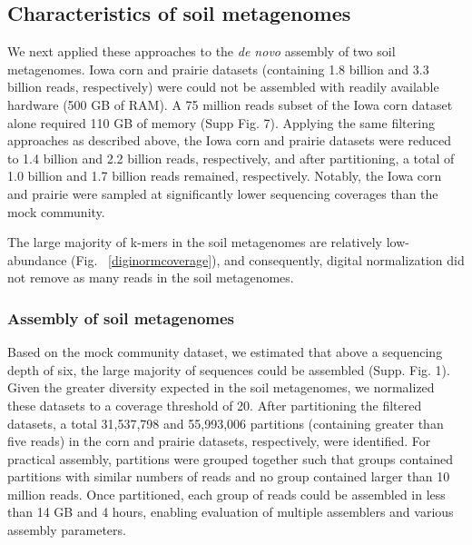 \documentclass[11pt]{article} %
\begin{document}
\subsection{Characteristics of soil metagenomes}

We next applied these approaches to the {\em de novo} assembly of two soil
metagenomes.  Iowa corn and prairie
datasets (containing 1.8 billion and 3.3 billion reads, respectively)
were could not be assembled with readily available hardware (500 GB of RAM).
A 75 million reads subset of the Iowa corn dataset alone required
110 GB of memory (Supp Fig. 7).  Applying the same
filtering approaches as described above, the Iowa corn and prairie
datasets were reduced to 1.4 billion and 2.2 billion reads,
respectively, and after partitioning, a total of 1.0 billion and 1.7
billion reads remained, respectively.  Notably, the Iowa corn and
prairie were sampled at significantly lower sequencing coverages than
the mock community.


The large majority of k-mers in the soil metagenomes are relatively
low-abundance (Fig. ~\ref{diginormcoverage}), and consequently,
digital normalization did not remove as many reads in the soil
metagenomes.

\subsubsection{Assembly of soil metagenomes}

Based on the mock community dataset, we estimated that above a
sequencing depth of six, the large majority of sequences could be
assembled (Supp. Fig. 1).  Given the greater
diversity expected in the soil metagenomes, we normalized these
datasets to a coverage threshold of 20.  After partitioning the
filtered datasets, a total 31,537,798 and 55,993,006 partitions
(containing greater than five reads) in the corn and prairie datasets,
respectively, were identified.  For practical assembly, partitions
were grouped together such that groups contained partitions with
similar numbers of reads and no group contained larger than 10 million
reads.  Once partitioned, each group of reads could be assembled in
less than 14 GB and 4 hours, enabling evaluation of multiple
assemblers and various assembly parameters.
\end{document}

